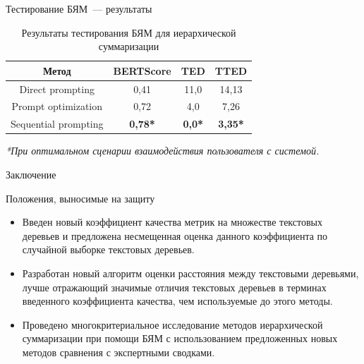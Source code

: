 \documentclass{beamer}
\begin{document}

\begin{frame}{Тестирование БЯМ~--- результаты}

\begin{table}[]
    \centering
    \begin{tabular}{c|c|c|c}
        Метод & BERTScore & TED & TTED \\ \hline
        Direct prompting & 0,41 & 11,0 & 14,13 \\ \hline
        Prompt optimization & 0,72 & 4,0 & 7,26 \\ \hline
        Sequential prompting & \textbf{0,78*} & \textbf{0,0*} & \textbf{3,35*} \\
    \end{tabular}
    \caption{Результаты тестирования БЯМ для иерархической суммаризации}
    \label{tab:llm_tests}
\end{table}

\textit{*При оптимальном сценарии взаимодействия пользователя с системой.}

\end{frame}


\begin{frame}{Заключение}
    \begin{block}{Положения, выносимые на защиту}
        \begin{itemize}
            \item Введен новый коэффициент качества метрик на множестве текстовых деревьев и предложена несмещенная оценка данного коэффициента по случайной выборке текстовых деревьев.
            \item Разработан новый алгоритм оценки расстояния между текстовыми деревьями, лучше отражающий значимые отличия текстовых деревьев в терминах введенного коэффициента качества, чем используемые до этого методы.
            \item Проведено многокритериальное исследование методов иерархической суммаризации при помощи БЯМ с использованием предложенных новых методов сравнения с экспертными сводками.
        \end{itemize}
    \end{block}
\end{frame}

\end{document}
